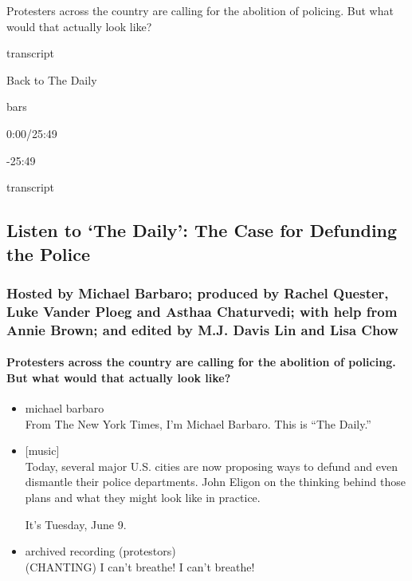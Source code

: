 Protesters across the country are calling for the abolition of policing.
But what would that actually look like?

transcript

Back to The Daily

bars

0:00/25:49

-25:49

transcript

\hypertarget{listen-to-the-daily-the-case-for-defunding-the-police-1}{%
\subsection{Listen to `The Daily': The Case for Defunding the
Police}\label{listen-to-the-daily-the-case-for-defunding-the-police-1}}

\hypertarget{hosted-by-michael-barbaro-produced-by-rachel-quester-luke-vander-ploeg-and-asthaa-chaturvedi-with-help-from-annie-brown-and-edited-by-mj-davis-lin-and-lisa-chow}{%
\subsubsection{Hosted by Michael Barbaro; produced by Rachel Quester,
Luke Vander Ploeg and Asthaa Chaturvedi; with help from Annie Brown; and
edited by M.J. Davis Lin and Lisa
Chow}\label{hosted-by-michael-barbaro-produced-by-rachel-quester-luke-vander-ploeg-and-asthaa-chaturvedi-with-help-from-annie-brown-and-edited-by-mj-davis-lin-and-lisa-chow}}

\hypertarget{protesters-across-the-country-are-calling-for-the-abolition-of-policing-but-what-would-that-actually-look-like}{%
\paragraph{Protesters across the country are calling for the abolition
of policing. But what would that actually look
like?}\label{protesters-across-the-country-are-calling-for-the-abolition-of-policing-but-what-would-that-actually-look-like}}

\begin{itemize}
\item
  michael barbaro\\
  From The New York Times, I'm Michael Barbaro. This is ``The Daily.''
\item
  {[}music{]}\\
  Today, several major U.S. cities are now proposing ways to defund and
  even dismantle their police departments. John Eligon on the thinking
  behind those plans and what they might look like in practice.

  It's Tuesday, June 9.
\item
  archived recording (protestors)\\
  (CHANTING) I can't breathe! I can't breathe!
\end{itemize}

